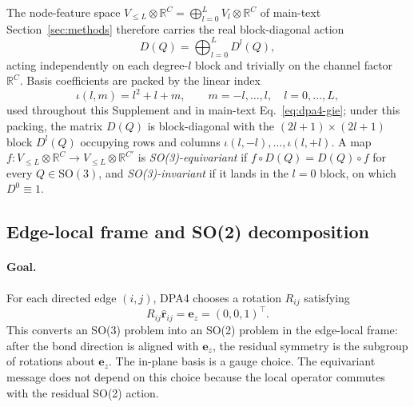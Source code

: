The node-feature space $V_{\le L}\otimes\mathbb{R}^{C}=\bigoplus_{l=0}^{L}
    V_l\otimes\mathbb{R}^{C}$ of main-text Section~\ref{sec:methods} therefore
carries the real block-diagonal action
\begin{equation}
    D(Q)=\bigoplus_{l=0}^{L}D^l(Q), \label{eq:sm-direct-sum} \end{equation} acting independently on each degree-$l$ block and trivially on the channel factor $\mathbb{R}^{C}$.
Basis coefficients are packed by the linear index
\begin{equation}
    \iota(l,m)=l^2+l+m,\qquad
    m=-l,\ldots,l,\quad l=0,\ldots,L,
    \label{eq:sm-pack-index}
\end{equation}
used throughout this Supplement and in main-text Eq.~\eqref{eq:dpa4-gie};
under this packing, the matrix $D(Q)$ is block-diagonal with the
$(2l+1)\times(2l+1)$ block $D^l(Q)$ occupying rows and columns
$\iota(l,-l),\ldots,\iota(l,+l)$.
A map $f:V_{\le L}\otimes\mathbb{R}^{C}\to V_{\le L}\otimes\mathbb{R}^{C'}$ is \emph{SO(3)-equivariant} if $f\circ D(Q)=D(Q)\circ f$ for every $Q\in\mathrm{SO}(3)$, and \emph{SO(3)-invariant} if it lands in the $l=0$ block, on which $D^0\equiv 1$.

\subsection{Edge-local frame and SO(2) decomposition}
\label{sec:sm-local-frame}

\paragraph{Goal.}
For each directed edge $(i,j)$, DPA4 chooses a rotation $R_{ij}$ satisfying
\begin{equation}
    R_{ij}\widehat{\mathbf{r}}_{ij}=\mathbf{e}_z=(0,0,1)^{\top}.
    \label{eq:sm-local-frame-goal}
\end{equation}
This converts an SO(3) problem into an SO(2) problem in the edge-local frame: after the bond direction is aligned with $\mathbf{e}_z$, the residual symmetry is the subgroup of rotations about $\mathbf{e}_z$.
The in-plane basis is a gauge choice.
The equivariant message does not depend on this choice because the local operator commutes with the residual SO(2) action.

